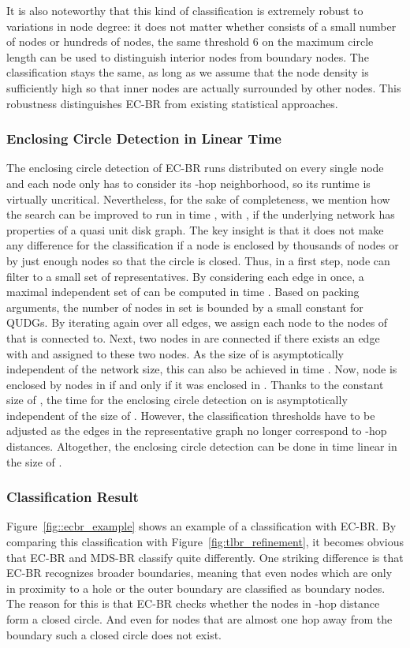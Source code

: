 \documentclass{llncs}
\begin{document}
It is also noteworthy that this kind of classification is extremely robust to variations in node degree: it does not matter whether  consists of a small number of nodes or hundreds of nodes, the same threshold 6 on the maximum circle length can be used to distinguish interior nodes from boundary nodes. 
The classification stays the same, as long as we assume that the node density is sufficiently high so that inner nodes are actually surrounded by other nodes.
This robustness distinguishes EC-BR from existing statistical approaches.

\subsubsection{Enclosing Circle Detection in Linear Time}
\label{ecbr_lintime}
The enclosing circle detection of EC-BR runs distributed on every single node and each node only has to consider its -hop neighborhood, so its runtime is virtually uncritical.
Nevertheless, for the sake of completeness, we mention how the search can be improved to run in time , with , if the underlying network has properties of a quasi unit disk graph.
The key insight is that it does not make any difference for the classification if a node  is enclosed by thousands of nodes or by just enough nodes so that the circle is closed.
Thus, in a first step, node  can filter  to a small set of representatives.
By considering each edge in  once, a maximal independent set  of  can be computed in time .
Based on packing arguments, the number of nodes in set  is bounded by a small constant for QUDGs.
By iterating again over all edges, we assign each node  to the nodes of  that  is connected to.
Next, two nodes in  are connected if there exists an edge  with  and  assigned to these two nodes.
As the size of  is asymptotically independent of the network size, this can also be achieved in time .
Now, node  is enclosed by nodes in  if and only if it was enclosed in .
Thanks to the constant size of , the time for the enclosing circle detection on  is asymptotically independent of the size of .
However, the classification thresholds have to be adjusted as the edges in the representative graph no longer correspond to -hop distances.
Altogether, the enclosing circle detection can be done in time linear in the size of .

\subsubsection{Classification Result}
Figure~\ref{fig::ecbr_example} shows an example of a classification with EC-BR.
By comparing this classification with Figure~\ref{fig:tlbr_refinement}, it becomes obvious that EC-BR and MDS-BR classify quite differently.
One striking difference is that EC-BR recognizes broader boundaries, meaning that even nodes which are only in proximity to a hole or the outer boundary are classified as boundary nodes.
The reason for this is that EC-BR checks whether the nodes in -hop distance form a closed circle.
And even for nodes that are almost one hop away from the boundary such a closed circle does not exist.
\end{document}
